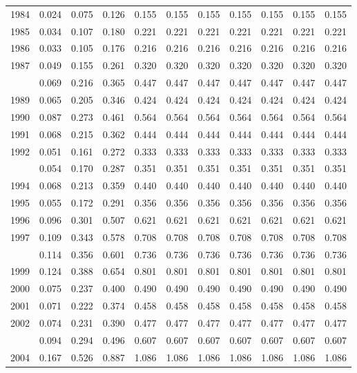 \documentclass[
]{article}
\begin{document}
\begin{longtable}[t]{lrrrrrrrrrr}
1984 & 0.024 & 0.075 & 0.126 & 0.155 & 0.155 & 0.155 & 0.155 & 0.155 & 0.155 & 0.155\\
1985 & 0.034 & 0.107 & 0.180 & 0.221 & 0.221 & 0.221 & 0.221 & 0.221 & 0.221 & 0.221\\
1986 & 0.033 & 0.105 & 0.176 & 0.216 & 0.216 & 0.216 & 0.216 & 0.216 & 0.216 & 0.216\\
1987 & 0.049 & 0.155 & 0.261 & 0.320 & 0.320 & 0.320 & 0.320 & 0.320 & 0.320 & 0.320\\
\addlinespace
1988 & 0.069 & 0.216 & 0.365 & 0.447 & 0.447 & 0.447 & 0.447 & 0.447 & 0.447 & 0.447\\
1989 & 0.065 & 0.205 & 0.346 & 0.424 & 0.424 & 0.424 & 0.424 & 0.424 & 0.424 & 0.424\\
1990 & 0.087 & 0.273 & 0.461 & 0.564 & 0.564 & 0.564 & 0.564 & 0.564 & 0.564 & 0.564\\
1991 & 0.068 & 0.215 & 0.362 & 0.444 & 0.444 & 0.444 & 0.444 & 0.444 & 0.444 & 0.444\\
1992 & 0.051 & 0.161 & 0.272 & 0.333 & 0.333 & 0.333 & 0.333 & 0.333 & 0.333 & 0.333\\
\addlinespace
1993 & 0.054 & 0.170 & 0.287 & 0.351 & 0.351 & 0.351 & 0.351 & 0.351 & 0.351 & 0.351\\
1994 & 0.068 & 0.213 & 0.359 & 0.440 & 0.440 & 0.440 & 0.440 & 0.440 & 0.440 & 0.440\\
1995 & 0.055 & 0.172 & 0.291 & 0.356 & 0.356 & 0.356 & 0.356 & 0.356 & 0.356 & 0.356\\
1996 & 0.096 & 0.301 & 0.507 & 0.621 & 0.621 & 0.621 & 0.621 & 0.621 & 0.621 & 0.621\\
1997 & 0.109 & 0.343 & 0.578 & 0.708 & 0.708 & 0.708 & 0.708 & 0.708 & 0.708 & 0.708\\
\addlinespace
1998 & 0.114 & 0.356 & 0.601 & 0.736 & 0.736 & 0.736 & 0.736 & 0.736 & 0.736 & 0.736\\
1999 & 0.124 & 0.388 & 0.654 & 0.801 & 0.801 & 0.801 & 0.801 & 0.801 & 0.801 & 0.801\\
2000 & 0.075 & 0.237 & 0.400 & 0.490 & 0.490 & 0.490 & 0.490 & 0.490 & 0.490 & 0.490\\
2001 & 0.071 & 0.222 & 0.374 & 0.458 & 0.458 & 0.458 & 0.458 & 0.458 & 0.458 & 0.458\\
2002 & 0.074 & 0.231 & 0.390 & 0.477 & 0.477 & 0.477 & 0.477 & 0.477 & 0.477 & 0.477\\
\addlinespace
2003 & 0.094 & 0.294 & 0.496 & 0.607 & 0.607 & 0.607 & 0.607 & 0.607 & 0.607 & 0.607\\
2004 & 0.167 & 0.526 & 0.887 & 1.086 & 1.086 & 1.086 & 1.086 & 1.086 & 1.086 & 1.086\\

\end{longtable}
\end{document}

